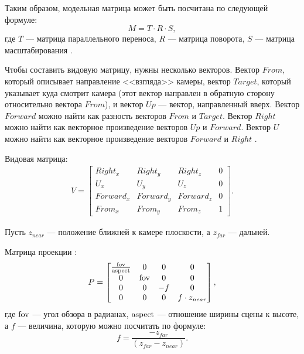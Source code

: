 Таким образом, модельная матрица может быть посчитана по следующей формуле:
\begin{equation}
M = T \cdot R \cdot S,
\end{equation}
где $T$ --- матрица параллельного переноса, $R$ --- матрица поворота, $S$ --- матрица масштабирования \cite{Jeremiah2011}.

Чтобы составить видовую матрицу, нужны несколько векторов. 
Вектор $From$, который описывает направление <<взгляда>> камеры, вектор $Target$, который указывает куда смотрит камера (этот вектор направлен в обратную сторону относительно вектора $From$), и вектор $Up$ --- вектор, направленный вверх. 
Вектор $Forward$ можно найти как разность векторов $From$ и $Target$. 
Вектор $Right$ можно найти как векторное произведение векторов $Up$ и $Forward$. 
Вектор $U$ можно найти как векторное произведение векторов $Forward$ и $Right$ \cite{Jeremiah2011}.

Видовая матрица:
\begin{equation}
\begin{gathered}
V = 
	\begin{bmatrix}
		Right_x & Right_y & Right_z & 0 \\
		U_x & U_y & U_z & 0 \\
		Forward_x & Forward_y & Forward_z & 0 \\
		From_x & From_y & From_z & 1
	\end{bmatrix}.
\end{gathered}
\end{equation}

Пусть $z_{near}$ --- положение ближней к камере плоскости, а $z_{far}$ --- дальней.

Матрица проекции \cite{Jeremiah2011}:
\begin{equation}
\begin{gathered}
P = 
	\begin{bmatrix}
		\frac{\operatorname{fov}}{\operatorname{aspect}} & 0 & 0 & 0 \\
		0 & \operatorname{fov} & 0 & 0 \\
		0 & 0 & -f & 0 \\
		0 & 0 & 0 & f \cdot z_{near}
	\end{bmatrix},
\end{gathered}
\end{equation}
где $\operatorname{fov}$ --- угол обзора в радианах, $\operatorname{aspect}$ --- отношение ширины сцены к высоте, а $f$ --- величина, которую можно посчитать по формуле:
\begin{equation}
f = \frac{-z_{far}}{(z_{far} - z_{near})}.
\end{equation}

